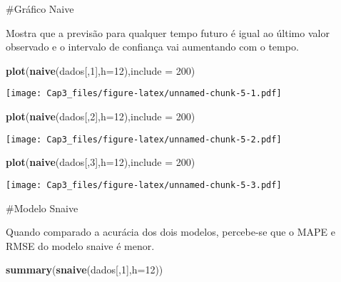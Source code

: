 \documentclass[]{article}
\newenvironment{Shaded}{\begin{snugshade}}{\end{snugshade}}
\newcommand{\DataTypeTok}[1]{\textcolor[rgb]{0.13,0.29,0.53}{#1}}
\newcommand{\DecValTok}[1]{\textcolor[rgb]{0.00,0.00,0.81}{#1}}
\newcommand{\KeywordTok}[1]{\textcolor[rgb]{0.13,0.29,0.53}{\textbf{#1}}}
\newcommand{\NormalTok}[1]{#1}
\begin{document}
\#Gráfico Naive

Mostra que a previsão para qualquer tempo futuro é igual ao último valor
observado e o intervalo de confiança vai aumentando com o tempo.

\begin{Shaded}
\begin{Highlighting}[]
\KeywordTok{plot}\NormalTok{(}\KeywordTok{naive}\NormalTok{(dados[,}\DecValTok{1}\NormalTok{],}\DataTypeTok{h=}\DecValTok{12}\NormalTok{),}\DataTypeTok{include =} \DecValTok{200}\NormalTok{)}
\end{Highlighting}
\end{Shaded}

\texttt{[image: Cap3\_files/figure-latex/unnamed-chunk-5-1.pdf]}

\begin{Shaded}
\begin{Highlighting}[]
\KeywordTok{plot}\NormalTok{(}\KeywordTok{naive}\NormalTok{(dados[,}\DecValTok{2}\NormalTok{],}\DataTypeTok{h=}\DecValTok{12}\NormalTok{),}\DataTypeTok{include =} \DecValTok{200}\NormalTok{)}
\end{Highlighting}
\end{Shaded}

\texttt{[image: Cap3\_files/figure-latex/unnamed-chunk-5-2.pdf]}

\begin{Shaded}
\begin{Highlighting}[]
\KeywordTok{plot}\NormalTok{(}\KeywordTok{naive}\NormalTok{(dados[,}\DecValTok{3}\NormalTok{],}\DataTypeTok{h=}\DecValTok{12}\NormalTok{),}\DataTypeTok{include =} \DecValTok{200}\NormalTok{)}
\end{Highlighting}
\end{Shaded}

\texttt{[image: Cap3\_files/figure-latex/unnamed-chunk-5-3.pdf]}

\#Modelo Snaive

Quando comparado a acurácia dos dois modelos, percebe-se que o MAPE e
RMSE do modelo snaive é menor.

\begin{Shaded}
\begin{Highlighting}[]
\KeywordTok{summary}\NormalTok{(}\KeywordTok{snaive}\NormalTok{(dados[,}\DecValTok{1}\NormalTok{],}\DataTypeTok{h=}\DecValTok{12}\NormalTok{))}
\end{Highlighting}
\end{Shaded}
\end{document}
